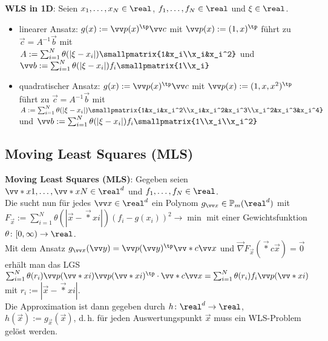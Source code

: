 \textbf{WLS in 1D}:
Seien $x_1, \dotsc, x_N \in \real$, $f_1, \dotsc, f_N \in \real$ und $\xi \in \real$.
\begin{itemize}
    \item
    linearer Ansatz:
    $g(x) := \vec{p}(x)^\tp \vec{c}$ mit $\vec{p}(x) := (1, x)^\tp$
    führt zu $\vec{c} = A^{-1} \vec{b}$ mit\\
    $A := \sum_{i=1}^N \theta(|\xi - x_i|) \smallpmatrix{1&x_i\\x_i&x_i^2}$ und
    $\vec{b} := \sum_{i=1}^N \theta(|\xi - x_i|) f_i \smallpmatrix{1\\x_i}$
    
    \item
    quadratischer Ansatz:
    $g(x) := \vec{p}(x)^\tp \vec{c}$ mit $\vec{p}(x) := (1, x, x^2)^\tp$
    führt zu $\vec{c} = A^{-1} \vec{b}$ mit\\
    $A := \sum_{i=1}^N \theta(|\xi - x_i|)
    \smallpmatrix{1&x_i&x_i^2\\x_i&x_i^2&x_i^3\\x_i^2&x_i^3&x_i^4}$ und
    $\vec{b} := \sum_{i=1}^N \theta(|\xi - x_i|) f_i \smallpmatrix{1\\x_i\\x_i^2}$
\end{itemize}

\pagebreak

\subsection{%
    Moving Least Squares (MLS)%
}

\textbf{Moving Least Squares (MLS)}:
Gegeben seien $\vec*{x}{1}, \dotsc, \vec*{x}{N} \in \real^d$ und
$f_1, \dotsc, f_N \in \real$.\\
Die  sucht nun für jedes $\vec{x} \in \real^d$
ein Polynom $g_{\vec{x}} \in \PP_m(\real^d)$ mit\\
$F_{\vec{x}} := \sum_{i=1}^N \theta(|\vec{x} - \vec*{x}{i}|) (f_i - g(x_i))^2 \to \min$
mit einer Gewichtsfunktion $\theta\colon [0, \infty) \to \real$.\\
Mit dem Ansatz $g_{\vec{x}}(\vec{y}) = \vec{p}(\vec{y})^\tp \vec*{c}{\vec{x}}$ und
$\vec{\nabla} F_{\vec{x}}(\vec*{c}{\vec{x}}) = \vec{0}$ erhält man das LGS\\
$\sum_{i=1}^N \theta(r_i) \vec{p}(\vec*{x}{i}) \vec{p}(\vec*{x}{i})^\tp \cdot \vec*{c}{\vec{x}}
= \sum_{i=1}^N \theta(r_i) f_i \vec{p}(\vec*{x}{i})$ mit $r_i := |\vec{x} - \vec*{x}{i}|$.\\
Die Approximation ist dann gegeben durch
$h\colon \real^d \to \real$, $h(\vec{x}) := g_{\vec{x}}(\vec{x})$,
d.\,h. für jeden Auswertungspunkt $\vec{x}$ muss ein WLS-Problem gelöst werden.

